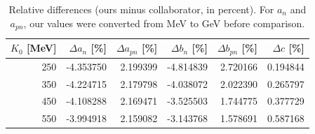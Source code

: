 \begin{table}[ht]
\centering
\small
\begin{tabular}{r r r r r r}
\hline
$K_0$ [MeV] & $\Delta a_n$ [\%] & $\Delta a_{pn}$ [\%] & $\Delta b_n$ [\%] & $\Delta b_{pn}$ [\%] & $\Delta c$ [\%] \\
\hline
250 & -4.353750 & 2.199399 & -4.814839 & 2.720166 & 0.194844 \\
350 & -4.224715 & 2.179798 & -4.038072 & 2.022390 & 0.265797 \\
450 & -4.108288 & 2.169471 & -3.525503 & 1.744775 & 0.377729 \\
550 & -3.994918 & 2.159082 & -3.143768 & 1.578691 & 0.587168 \\
\hline
\end{tabular}
\caption{Relative differences (ours minus collaborator, in percent). For $a_n$ and $a_{pn}$, our values were converted from MeV to GeV before comparison.}
\end{table}

